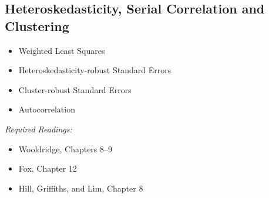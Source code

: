 \documentclass{article}
\begin{document}
\subsection{Heteroskedasticity, Serial Correlation and Clustering}
	\begin{itemize}
	\item Weighted Least Squares
	\item Heteroskedasticity-robust Standard Errors
	\item Cluster-robust Standard Errors
	\item Autocorrelation
\end{itemize}
\textit{Required Readings:} \begin{itemize}
  \item Wooldridge, Chapters 8--9
\item  Fox, Chapter 12
  \item Hill, Griffiths, and Lim, Chapter 8 
  \end{itemize}
\end{document}
